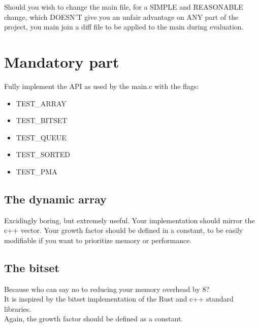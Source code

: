 \documentclass{42-en}
\begin{document}

    Should you wish to change the main file, for a SIMPLE and REASONABLE change,
    which DOESN'T give you an unfair advantage on ANY part of the project, you main join a diff
    file to be applied to the main during evaluation.\\



\chapter{Mandatory part}

    Fully implement the API as used by the main.c with the flags:

    \begin{itemize}\itemsep7pt
        \item TEST\_ARRAY
        \item TEST\_BITSET
        \item TEST\_QUEUE
        \item TEST\_SORTED
        \item TEST\_PMA
    \end{itemize}

    \section{The dynamic array}
    Excidingly boring, but extremely useful.
    Your implementation should mirror the c++ vector. Your growth factor should
    be defined in a constant, to be easily modifiable if you want to prioritize
    memory or performance.

    \section{The bitset}
    Because who can say no to reducing your memory overhead by 8?\\
    It is inspired by the bitset implementation of the Rust and c++ standard libraries.\\
    Again, the growth factor should be defined as a constant.
\end{document}
